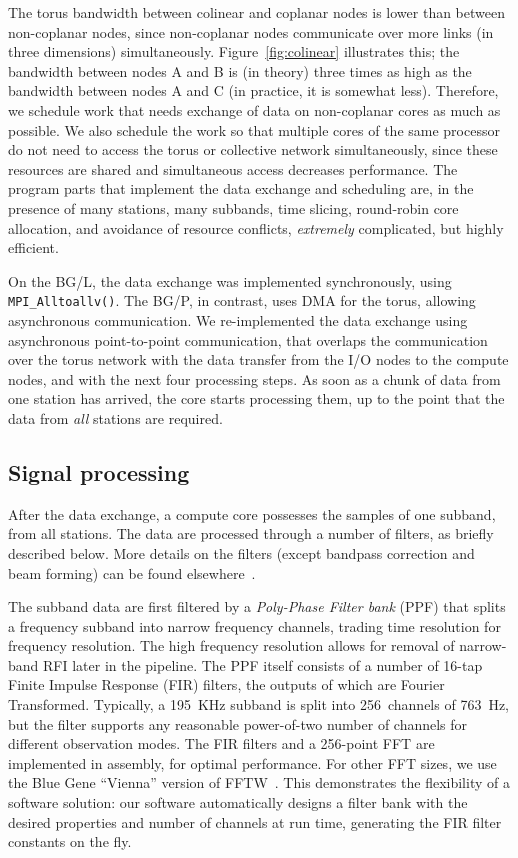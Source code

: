 \documentclass{sig-alternate}
\begin{document}
The torus bandwidth between colinear and coplanar nodes is lower than between
non-coplanar nodes, since non-coplanar nodes communicate over more links
(in three dimensions) simultaneously.
Figure~\ref{fig:colinear} illustrates this; the bandwidth between nodes
\textsf{A} and \textsf{B} is (in theory) three times as high as the bandwidth
between nodes \textsf{A} and \textsf{C} (in practice, it is somewhat less).
Therefore, we schedule work that needs exchange of data 
on non-coplanar cores as much as possible.
We also schedule the work so that multiple cores of the same processor do not
need to access the torus or collective network simultaneously, since these
resources are shared and simultaneous access decreases performance.
The program parts that implement the data exchange and scheduling are, in the
presence of many stations, many subbands, time slicing, round-robin core
allocation, and avoidance of resource conflicts, \emph{extremely\/}
complicated, but highly efficient.

On the BG/L, the data exchange was implemented synchronously, using
\texttt{MPI\_Alltoallv()}.
The BG/P, in contrast, uses DMA for the torus, allowing asynchronous
communication.
We re-implemented the data exchange using asynchronous point-to-point
communication, that overlaps the communication over the torus network with 
the data transfer from the I/O nodes to the compute nodes, and with
the next four processing steps.
As soon as a chunk of data from one station has arrived, the core starts
processing them, up to the point that the data from \emph{all\/} stations
are required. 


\subsection{Signal processing}
\label{sec:signal-processing}

After the data exchange, a compute core possesses the samples of one subband,
from all stations.
The data are processed through a number of filters, as briefly described below.
More details on the filters (except bandpass correction and beam forming)
can be found elsewhere~\cite{Romein:06}.

The subband data are first filtered by a \emph{Poly-Phase Filter bank\/} (PPF) that
splits a frequency subband into narrow frequency channels, trading time
resolution for frequency resolution.
The high frequency resolution allows for removal of narrow-band RFI later in
the pipeline.
The PPF itself consists of a number of 16-tap Finite Impulse Response (FIR)
filters, the outputs of which are Fourier Transformed.
Typically, a 195~KHz subband is split into 256~channels of 763~Hz, but the
filter supports any reasonable power-of-two number of channels for different
observation modes.
The FIR filters and a 256-point FFT are implemented in assembly, for optimal
performance.
For other FFT sizes, we use the Blue Gene ``Vienna'' version of
FFTW~\cite{Lorenz:05}.
This demonstrates the flexibility of a software solution: our software
automatically designs a filter bank with the desired properties and
number of channels at run time, generating the FIR filter constants on
the fly.
\end{document}
